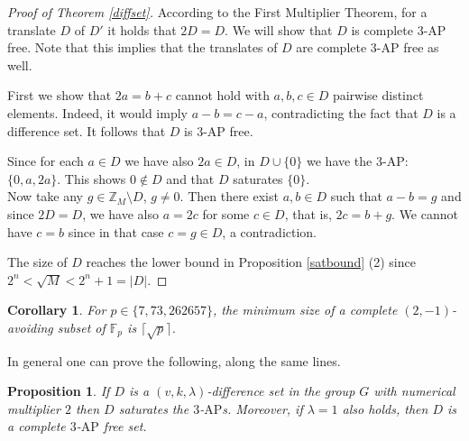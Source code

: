 \documentclass[11pt]{article}
\numberwithin{table}{section}
\newcommand{\F}{{\mathbb F}}
\newtheorem{corollary}[theorem]{Corollary}
\newtheorem{prop}[theorem]{\bf Proposition}
\theoremstyle{definition}
\begin{document}
	\begin{proof}[Proof of Theorem \ref{diffset}]
		According to the First Multiplier Theorem, for a translate $D$ of $D'$ it holds that $2D=D$. We will show that $D$ is complete $3$-$\mathrm{AP}$ free. Note that this implies that the translates of $D$ are complete $3$-$\mathrm{AP}$ free as well.
		
		
		First we show that $2a=b+c$ cannot hold with $a,b,c\in D$ pairwise distinct elements. Indeed, it would imply $a-b=c-a$, contradicting the fact that $D$ is a difference set. It follows that $D$ is $3$-$\mathrm{AP}$ free.
		
		Since for each $a\in D$ we have also $2a \in D$, in $D \cup \{0\}$ we have the $3$-$\mathrm{AP}$: $\{0,a,2a\}$. This shows $0\notin D$ and that $D$ saturates $\{0\}$.\\    
		Now take any $g\in \mathbb{Z}_M \setminus D$, $g\neq 0$. Then there exist $a,b\in D$  such that $a-b=g$ and since $2D=D$, we have also $a=2c$ for some $c\in D$, that is, $2c=b+g$. We cannot have $c=b$ since in that case $c=g \in D$, a contradiction.
		
		The size of $D$ reaches the lower bound in Proposition \ref{satbound} (2) since $2^n<\sqrt{M}<2^n+1=|D|$.
	\end{proof}
	
	\begin{corollary}
		For $p\in \{7,73,262657\}$, the minimum size of a complete $(2,-1)$-avoiding subset of $\F_p$ is $\lceil \sqrt{p}\rceil$.
	\end{corollary}
	
	
	
	In general one can prove the following, along the same lines.
	
	\begin{prop}
		If $D$ is a $(v,k,\lambda)$-difference set in the group $G$ with numerical multiplier $2$ then $D$ saturates the $3$-$\mathrm{AP}$s.  Moreover, if $\lambda=1$ also holds, then $D$ is a complete $3$-$\mathrm{AP}$ free set.%
	\end{prop}
	
\end{document}
